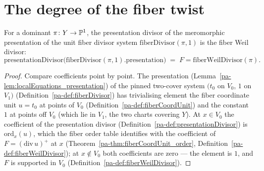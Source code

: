 \section{The degree of the fiber twist}
\label{pa-sec:thetaDegree}

\begin{theorem}
  \label{pa-thm:presentationDivisor_fiberDivisor_one}
  \leanok

  For a dominant \(\pi \colon Y \to \mathbb{P}^1\), the presentation divisor of the meromorphic
  presentation of the unit fiber divisor system \(\mathrm{fiberDivisor}(\pi,1)\) is the
  fiber Weil divisor:
  \[
    \mathrm{presentationDivisor}\bigl(\mathrm{fiberDivisor}(\pi,1).\mathrm{presentation}\bigr)
      \;=\; F = \mathrm{fiberWeilDivisor}(\pi) .
  \]
\end{theorem}
\begin{proof}
  \leanok
  Compare coefficients point by point. The presentation
  (Lemma~\ref{pa-lem:localEquations_presentation}) of the pinned two-cover system \((t_0\)
  on \(V_0\), \(1\) on \(V_1)\) (Definition~\ref{pa-def:fiberDivisor}) has trivialising
  element the fiber coordinate unit \(u = t_0\) at points of \(V_0\)
  (Definition~\ref{pa-def:fiberCoordUnit}) and the constant \(1\) at points off \(V_0\)
  (which lie in \(V_1\), the two charts covering \(Y\)). At \(x \in V_0\) the coefficient
  of the presentation divisor (Definition~\ref{pa-def:presentationDivisor}) is
  \(\mathrm{ord}_x(u)\), which the fiber order table identifies with the coefficient of
  \(F = (\mathrm{div}\,u)^{+}\) at \(x\) (Theorem~\ref{pa-thm:fiberCoordUnit_order},
  Definition~\ref{pa-def:fiberWeilDivisor}); at \(x \notin V_0\) both coefficients are zero —
  the element is \(1\), and \(F\) is supported in \(V_0\)
  (Definition~\ref{pa-def:fiberWeilDivisor}).
\end{proof}

